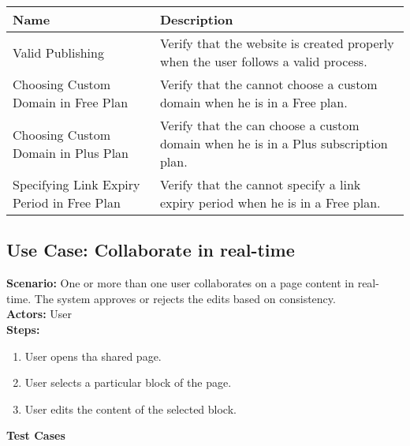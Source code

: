 \documentclass{article}
\begin{document}
            \begin{longtable}{|p{}|p{}|}
            \hline
            \textbf{Name} & \textbf{Description} \\
            \hline
            Valid Publishing & Verify that the website is created properly when the user follows a valid process. \\
\hline
Choosing Custom Domain in Free Plan & Verify that the cannot choose a custom domain when he is in a Free plan. \\
\hline
Choosing Custom Domain in Plus Plan & Verify that the can choose a custom domain when he is in a Plus subscription plan. \\
\hline
Specifying Link Expiry Period in Free Plan & Verify that the cannot specify a link expiry period when he is in a Free plan. \\
\hline
\end{longtable}\subsection{\textbf{Use Case: Collaborate in real-time}}
\textbf{Scenario:} One or more than one user collaborates on a page content in real-time. The system approves or rejects the edits based on consistency.\\
\textbf{Actors:} User\\
\textbf{Steps:}
\begin{enumerate}
\item User opens tha shared page.
\item User selects a particular block of the page.
\item User edits the content of the selected block.
\end{enumerate}
\textbf{Test Cases}
\end{document}
